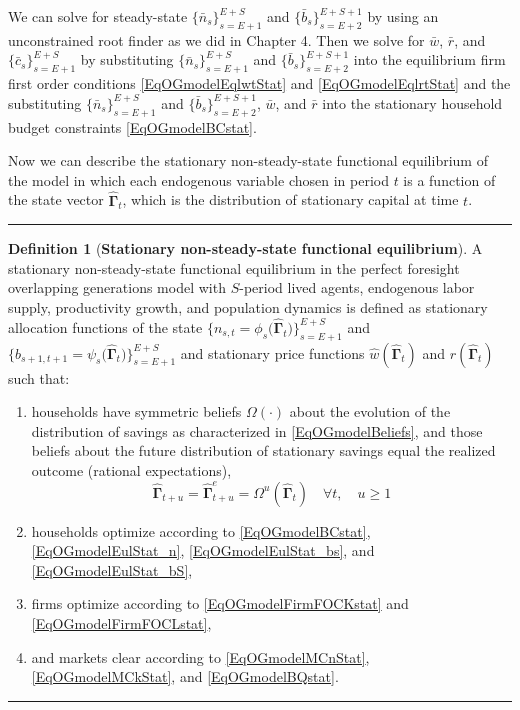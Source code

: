 \documentclass[letterpaper,12pt]{article}
\theoremstyle{definition}
\newtheorem{definition}{Definition} %
\begin{document}
    We can solve for steady-state $\{\bar{n}_s\}_{s=E+1}^{E+S}$ and $\{\bar{b}_s\}_{s=E+2}^{E+S+1}$ by using an unconstrained root finder as we did in Chapter 4. Then we solve for $\bar{w}$, $\bar{r}$, and $\{\bar{c}_s\}_{s=E+1}^{E+S}$ by substituting $\{\bar{n}_s\}_{s=E+1}^{E+S}$ and $\{\bar{b}_s\}_{s=E+2}^{E+S+1}$ into the equilibrium firm first order conditions \eqref{EqOGmodelEqlwtStat} and \eqref{EqOGmodelEqlrtStat} and the substituting $\{\bar{n}_s\}_{s=E+1}^{E+S}$ and $\{\bar{b}_s\}_{s=E+2}^{E+S+1}$, $\bar{w}$, and $\bar{r}$ into the stationary household budget constraints \eqref{EqOGmodelBCstat}.

    Now we can describe the stationary non-steady-state functional equilibrium of the model in which each endogenous variable chosen in period $t$ is a function of the state vector $\bm{\hat{\Gamma}}_t$, which is the distribution of stationary capital at time $t$.

    \vspace{5mm}
    \hrule
    \vspace{-1mm}
    \begin{definition}[\textbf{Stationary non-steady-state functional equilibrium}]\label{DefOGmodelNSSEql}
      A stationary non-steady-state functional equilibrium in the perfect foresight overlapping generations model with $S$-period lived agents, endogenous labor supply, productivity growth, and population dynamics is defined as stationary allocation functions of the state $\bigl\{n_{s,t}=\phi_{s}\bigl(\bm{\hat{\Gamma}}_t\bigr)\bigr\}_{s=E+1}^{E+S}$ and $\bigl\{\hat{b}_{s+1,t+1}=\psi_{s}\bigl(\bm{\hat{\Gamma}}_t\bigr)\bigr\}_{s=E+1}^{E+S}$ and stationary price functions $\hat{w}(\bm{\hat{\Gamma}}_t)$ and $r(\bm{\hat{\Gamma}}_t)$ such that:
      \begin{enumerate}
        \item households have symmetric beliefs $\Omega(\cdot)$ about the evolution of the distribution of savings as characterized in \eqref{EqOGmodelBeliefs}, and those beliefs about the future distribution of stationary savings equal the realized outcome (rational expectations),
        \begin{equation*}
          \bm{\hat{\Gamma}}_{t+u} = \bm{\hat{\Gamma}}^e_{t+u} = \Omega^u\left(\bm{\hat{\Gamma}}_t\right) \quad\forall t,\quad u\geq 1
        \end{equation*}
        \item households optimize according to \eqref{EqOGmodelBCstat}, \eqref{EqOGmodelEulStat_n}, \eqref{EqOGmodelEulStat_bs}, and \eqref{EqOGmodelEulStat_bS},
        \item firms optimize according to \eqref{EqOGmodelFirmFOCKstat} and \eqref{EqOGmodelFirmFOCLstat},
        \item and markets clear according to \eqref{EqOGmodelMCnStat}, \eqref{EqOGmodelMCkStat}, and \eqref{EqOGmodelBQstat}.
      \end{enumerate}
    \end{definition}
    \vspace{-2mm}
    \hrule
    \vspace{5mm}
\end{document}
